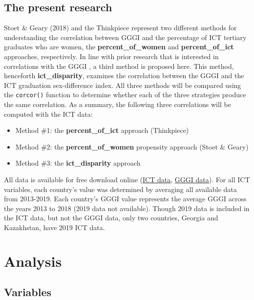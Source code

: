 \documentclass[]{book}
\providecommand{\tightlist}{%
  \setlength{\itemsep}{0pt}\setlength{\parskip}{0pt}}
\begin{document}
\section{The present research}\label{the-present-research-1}

Stoet \& Geary (2018) and the Thinkpiece represent two different methods
for understanding the correlation between GGGI and the percentage of ICT
tertiary graduates who are women, the \textbf{percent\_of\_women} and
\textbf{percent\_of\_ict} approaches, respectively. In line with prior
research that is interested in correlations with the GGGI
\citep{http://zotero.org/users/local/QzsQ9z3m/items/UTQ7LAC5}, a third
method is proposed here. This method, henceforth
\textbf{ict\_disparity}, examines the correlation between the GGGI and
the ICT graduation sex-difference index. All three methods will be
compared using the \texttt{corcor()} function to determine whether each
of the three strategies produce the same correlation. As a summary, the
following three correlations will be computed with the ICT data:

\begin{itemize}
\tightlist
\item
  Method \#1: the \textbf{percent\_of\_ict} approach (Thinkpiece)
\item
  Method \#2: the \textbf{percent\_of\_women} propensity approach (Stoet
  \& Geary)
\item
  Method \#3: the \textbf{ict\_disparity} approach
\end{itemize}

All data is available for free download online
(\href{http://data.uis.unesco.org/Index.aspx?DataSetCode=EDULIT_DS\&popupcustomise=true\&lang=en\#}{ICT
data},
\href{https://tcdata360-backend.worldbank.org/api/v1/datasets/743/dump.csv}{GGGI
data}). For all ICT variables, each country's value was determined by
averaging all available data from 2013-2019. Each country's GGGI value
represents the average GGGI across the years 2013 to 2018 (2019 data not
available). Though 2019 data is included in the ICT data, but not the
GGGI data, only two countries, Georgia and Kazakhstan, have 2019 ICT
data.

\chapter{Analysis}\label{analysis}

\section{Variables}\label{variables}
\end{document}
